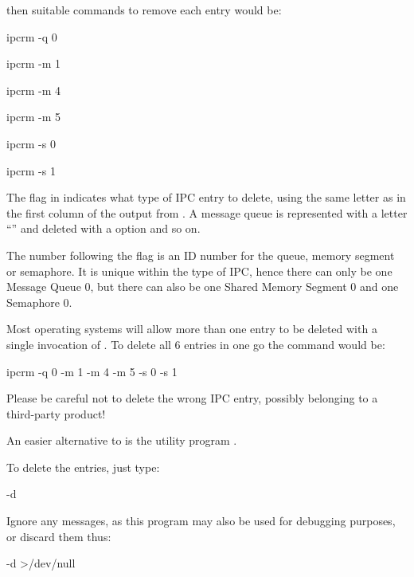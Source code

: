 then suitable  commands to remove each entry would be:

\begin{expara}

ipcrm -q 0

ipcrm -m 1

ipcrm -m 4

ipcrm -m 5

ipcrm -s 0

ipcrm -s 1

\end{expara}

The flag in  indicates what type of IPC entry to delete, using the same letter as in the first column of the
output from . A message queue is represented with a letter ``'' and deleted with
a  option and so on.

The number following the flag is an ID number for the queue, memory segment or semaphore. It is unique within the type of IPC, hence there
can only be one Message Queue 0, but there can also be one Shared Memory Segment 0 and one Semaphore 0.

Most operating systems will allow more than one entry to be deleted with a single invocation of . To delete all 6
entries in one go the command would be:

\begin{expara}

ipcrm -q 0 -m 1 -m 4 -m 5 -s 0 -s 1

\end{expara}

Please be careful not to delete the wrong IPC entry, possibly belonging to a third-party product!

An easier alternative to  is the utility program \PrXbRipc.

To delete the entries, just type:

\begin{expara}

\XbRipcName -d

\end{expara}

Ignore any messages, as this program may also be used for debugging purposes, or discard them thus:

\begin{expara}

\XbRipcName -d {\textgreater}/dev/null

\end{expara}


